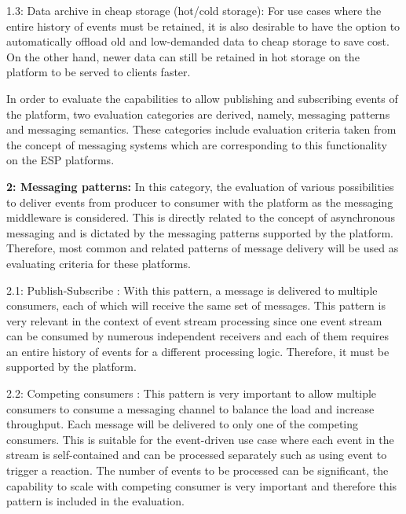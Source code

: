 1.3: Data archive in cheap storage (hot/cold storage): For use cases where the entire history of events must be retained, it is also desirable to have the option to automatically offload old and low-demanded data to cheap storage to save cost. On the other hand, newer data can still be retained in hot storage on the platform to be served to clients faster.

In order to evaluate the capabilities to allow publishing and subscribing events of the platform, two evaluation categories are derived, namely, messaging patterns and messaging semantics. These categories include evaluation criteria taken from the concept of messaging systems which are corresponding to this functionality on the ESP platforms.

\textbf{2: Messaging patterns:} In this category, the evaluation of various possibilities to deliver events from producer to consumer with the platform as the messaging middleware is considered. This is directly related to the concept of asynchronous messaging and is dictated by the messaging patterns supported by the platform. Therefore, most common and related patterns of message delivery will be used as evaluating criteria for these platforms.

2.1: Publish-Subscribe \cite{messagingpubsub}: 
With this pattern, a message is delivered to multiple consumers, each of which will receive the same set of messages. This pattern is very relevant in the context of event stream processing since one event stream can be consumed by numerous independent receivers and each of them requires an entire history of events for a different processing logic. Therefore, it must be supported by the platform.

2.2: Competing consumers \cite{messagingcompetingconsumer}:
This pattern is very important to allow multiple consumers to consume a messaging channel to balance the load and increase throughput. Each message will be delivered to only one of the competing consumers. This is suitable for the event-driven use case where each event in the stream is self-contained and can be processed separately such as using event to trigger a reaction. The number of events to be processed can be significant, the capability to scale with competing consumer is very important and therefore this pattern is included in the evaluation.

